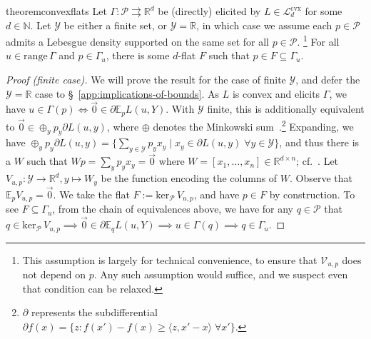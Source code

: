 \documentclass{article} %
\newcommand{\Comments}{0}
\newcommand{\mytodo}[2]{\ifnum\Comments=1%
	\todo[linecolor=#1!80!black,backgroundcolor=#1,bordercolor=#1!80!black]{#2}\fi}
\newcommand{\btw}[1]{}%
\newcommand{\reals}{\mathbb{R}}
\newcommand{\range}{\mathrm{range}\,}
\newcommand{\zeros}[1]{\mathrm{ker}_\P\,#1}
\newcommand{\E}{\mathbb{E}}
\newcommand{\Lcvx}{\mathcal{L}^{\mathrm{cvx}}}
\renewcommand{\P}{\mathcal{P}}
\newcommand{\V}{\mathcal{V}}
\newcommand{\Y}{\mathcal{Y}}
\newcommand{\exploss}[3]{\E_{#3} #1(#2,Y)}
\newcommand{\inprod}[2]{\langle #1, #2 \rangle}
\newcommand{\toto}{\rightrightarrows}
\begin{document}
\begin{restatable}{theorem}{convexflats}  \label{thm:convex-flats-inf-dim}
  Let $\Gamma:\P \toto \reals^d$ be (directly) elicited by $L \in \Lcvx_d$ for some $d\in\mathbb{N}$.
  Let $\Y$ be either a finite set, or $\Y = \reals$, in which case we assume each $p\in\P$ admits a Lebesgue density supported on the same set for all $p\in\P$.%
  \footnote{This assumption is largely for technical convenience, to ensure that $\V_{u,p}$ does not depend on $p$.
    Any such assumption would suffice, and we suspect even that condition can be relaxed.}
  For all $u\in\range\Gamma$ and $p\in\Gamma_u$, there is some $d$-flat $F$ such that $p \in F \subseteq \Gamma_u$.
\btw{Raf: let's ditch $V_{u,p}$ in the statement, and instead say ``there is some $d$-flat $F$ such that $p \in F \subseteq \Gamma_u$'', since (a) that's the way we write it everywhere else, (b) we justify the story that our main tool is about $d$-flats, and (c) it becomes clearer why the two Corollaries could follow.  Am I missing a reason to keep $V_{u,p}$? Jessie: I like this change; kept the old version in a comment, but no reason I can think of to keep $V_{u,p}$}
\end{restatable}
\begin{proof}[Proof (finite case)]
  We will prove the result for the case of finite $\Y$, and defer the $\Y=\reals$ case to \S~\ref{app:implications-of-bounds}.
  As $L$ is convex and elicits $\Gamma$, we have $u \in \Gamma(p) \iff \vec 0 \in \partial \exploss{L}{u}{p}$. 
  With $\Y$ finite, this is additionally equivalent to $\vec 0 \in \oplus_y p_y \partial L(u,y)$, where $\oplus$ denotes the Minkowski sum~\citep[Theorem 4.1.1]{hiriart2012fundamentals}.\footnote{$\partial$ represents the subdifferential $\partial f(x) = \{z : f(x') - f(x) \geq \inprod{z}{x'-x}\; \forall x' \}$.}
  Expanding, we have $\oplus_y p_y \partial L(u,y) = \{ \sum_{y\in\Y} p_y x_y \mid x_y \in \partial L(u,y) \; \forall y\in\Y\}$, and thus there is a $W$ such that $W p = \sum_y p_y x_y = \vec 0$ where $W = [x_1, \ldots, x_n] \in \reals^{d\times n}$; cf.~\cite[$\mathbf{A}^m$ in Theorem 16]{ramaswamy2016convex}.
  Let $V_{u,p} : \Y \to \reals^d, y \mapsto W_y$ be the function encoding the columns of $W$.
  Observe that $\E_p V_{u,p} = \vec 0$.				 
  We take the flat $F := \zeros{V_{u,p}}$, and have $p \in F$ by construction.
  To see $F \subseteq \Gamma_u$, from the chain of equivalences above, we have for any $q\in\P$ that $q \in \zeros{V_{u,p}} \implies \vec 0 \in \partial \E_q L(u,Y) \implies u \in \Gamma(q) \implies q \in \Gamma_u$.
\end{proof}
\end{document}
